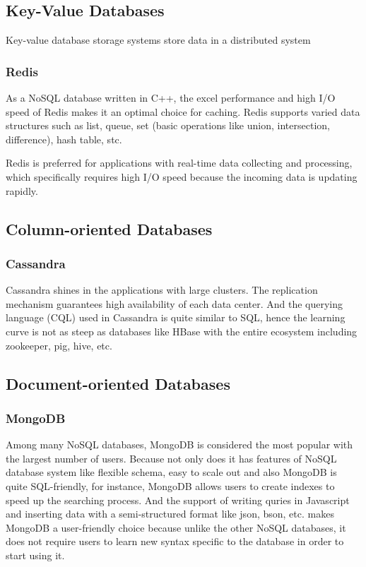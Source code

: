 \subsection{Key-Value Databases}

Key-value database storage systems store data in a distributed system

\subsubsection{Redis}\mbox{}\mbox{}

As a NoSQL database written in C++, the excel performance and high I/O speed of Redis makes it an optimal choice for 
caching. Redis supports varied data structures such as list, queue, set (basic operations like union, intersection, difference), hash table, stc. 

Redis is preferred for applications with real-time data collecting and processing, which specifically requires high I/O speed because the incoming data is updating rapidly.

\subsection{Column-oriented Databases}

\subsubsection{Cassandra}\mbox{}\mbox{}

Cassandra shines in the applications with large clusters. The replication mechanism guarantees high availability of each data center. And the querying language (CQL) used in Cassandra is quite similar to SQL, hence the learning curve is not as steep as databases like HBase with the entire ecosystem including zookeeper, pig, hive, etc.

\subsection{Document-oriented Databases}

\subsubsection{MongoDB}\mbox{}

Among many NoSQL databases, MongoDB is considered the most popular with the largest number of users. Because not only does it has features of NoSQL database system like flexible schema, easy to scale out and also MongoDB is quite SQL-friendly, for instance, MongoDB allows users to create indexes to speed up the searching process. And the support of writing quries in Javascript and inserting data with a semi-structured format like json, bson, etc. makes MongoDB a user-friendly choice because unlike the other NoSQL databases, it does not require users to learn new syntax specific to the database in order to start using it.


